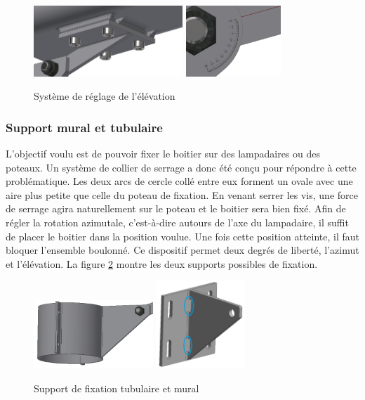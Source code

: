 \begin{figure}[H]
    \centering
    \includegraphics[width=0.5\textwidth]{Images/photos_PGA/fixdessous2.PNG}
    \includegraphics[width=0.32\textwidth]{Images/photos_PGA/mesure d'angle.PNG}
    \caption{Système de réglage de l'élévation}
    \label{fig:angle}
\end{figure}

\subsubsection{Support mural et tubulaire}

L’objectif voulu est de pouvoir fixer le boitier sur des lampadaires ou des poteaux. Un système de 
collier de serrage a donc été conçu pour répondre à cette problématique. Les deux arcs de cercle collé 
entre eux forment un ovale avec une aire plus petite que celle du poteau de fixation. En venant 
serrer les vis, une force de serrage agira naturellement sur le poteau et le boitier sera bien fixé. 
Afin de régler la rotation azimutale, c’est-à-dire autours de l’axe du lampadaire, il suffit de placer 
le boitier dans la position voulue. Une fois cette position atteinte, il faut bloquer l’ensemble boulonné. 
Ce dispositif permet deux degrés de liberté, l’azimut et l’élévation. La figure \ref{fig:supfix} montre 
les deux supports possibles de fixation.

\begin{figure}[H]
    \centering
    \includegraphics[width=0.4\textwidth]{Images/photos_PGA/collierSupport2.PNG}
    \includegraphics[width=0.3\textwidth]{Images/photos_PGA/supportmural2.PNG}
    \caption{Support de fixation tubulaire et mural}
    \label{fig:supfix}
\end{figure}

